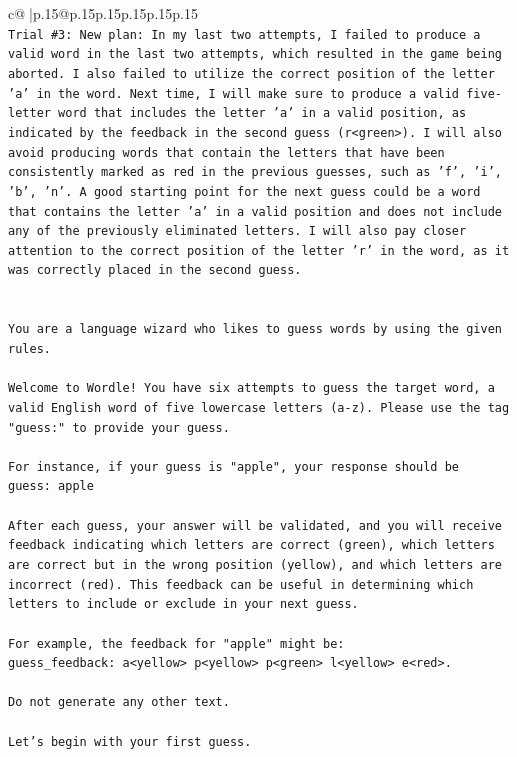 \documentclass{article}
\begin{document}
{\begin{supertabular}{c@{$\;$}|p{.15\linewidth}@{}p{.15\linewidth}p{.15\linewidth}p{.15\linewidth}p{.15\linewidth}p{.15\linewidth}}
{{{\\ 
\texttt{Trial \#3: New plan: In my last two attempts, I failed to produce a valid word in the last two attempts, which resulted in the game being aborted. I also failed to utilize the correct position of the letter 'a' in the word. Next time, I will make sure to produce a valid five{-}letter word that includes the letter 'a' in a valid position, as indicated by the feedback in the second guess (r<green>). I will also avoid producing words that contain the letters that have been consistently marked as red in the previous guesses, such as 'f', 'i', 'b', 'n'. A good starting point for the next guess could be a word that contains the letter 'a' in a valid position and does not include any of the previously eliminated letters. I will also pay closer attention to the correct position of the letter 'r' in the word, as it was correctly placed in the second guess.} \\
\\ 
\\ 
\texttt{You are a language wizard who likes to guess words by using the given rules.} \\
\\ 
\texttt{Welcome to Wordle! You have six attempts to guess the target word, a valid English word of five lowercase letters (a{-}z). Please use the tag "guess:" to provide your guess.} \\
\\ 
\texttt{For instance, if your guess is "apple", your response should be} \\
\texttt{guess: apple} \\
\\ 
\texttt{After each guess, your answer will be validated, and you will receive feedback indicating which letters are correct (green), which letters are correct but in the wrong position (yellow), and which letters are incorrect (red). This feedback can be useful in determining which letters to include or exclude in your next guess.} \\
\\ 
\texttt{For example, the feedback for "apple" might be:} \\
\texttt{guess\_feedback: a<yellow> p<yellow> p<green> l<yellow> e<red>.} \\
\\ 
\texttt{Do not generate any other text.} \\
\\ 
\texttt{Let's begin with your first guess.} \\
            }
        }
    }
     \\ \\


\end{supertabular}}
\end{document}
